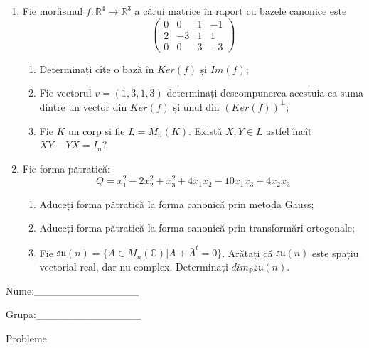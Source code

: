 \documentclass{article}
\begin{document}
\begin{enumerate}
 \item Fie morfismul $f:\mathbb{R}^4 \to \mathbb{R}^3$ a cărui matrice în raport cu bazele canonice este
$$\begin{pmatrix}
0&0&1&-1\\
2&-3&1&1\\
0&0&3&-3
\end{pmatrix}$$

\begin{enumerate}
\item Determinați cîte o bază în $Ker(f)$ și $Im(f)$;
\item Fie vectorul $v=(1,3,1,3)$ determinați descompunerea acestuia ca suma dintre un vector din $Ker(f)$ și unul din $(Ker(f))^\perp$;
\item Fie $K$ un corp și fie $L=M_n(K)$. Există $X,Y \in L$ astfel încît $XY-YX=I_n$?  
\end{enumerate}
\item Fie forma pătratică:
$$Q= x_1^2-2x_2^2+x_3^2+4x_1x_2-10x_1x_3+4x_2x_3$$

\begin{enumerate}
\item Aduceți forma pătratică la forma canonică prin metoda Gauss;
\item Aduceți forma pătratică la forma canonică prin transformări ortogonale;
\item Fie $\mathfrak{su}(n)=\{ A \in M_n(\mathbb{C}) | A+\bar{A}^t=0\}$. Arătați că $\mathfrak{su}(n)$ este spațiu vectorial real, dar nu complex.
Determinați $dim_{\mathbb{R}}\mathfrak{su}(n)$.
\end{enumerate}
\end{enumerate}
\newpage
\begin{flushright}
Nume:\_\_\_\_\_\_\_\_\_\_\_\_\_\_
 
 
Grupa:\_\_\_\_\_\_\_\_\_\_\_\_\_\_
\end{flushright}
\begin{center}
\vspace{2cm}
{\Large Probleme}
\vspace{2cm}
\end{center}
\end{document}
